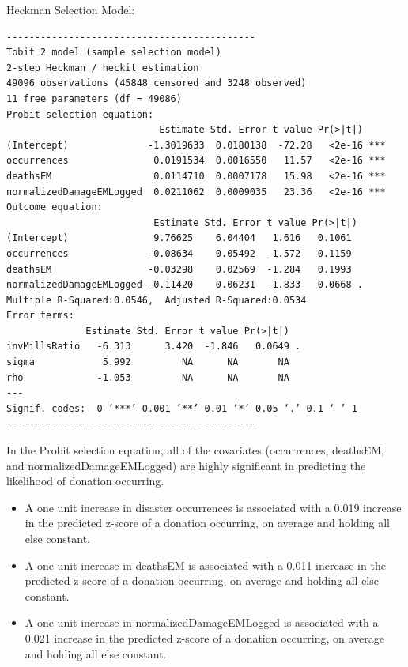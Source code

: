 \documentclass[12pt,letterpaper]{article}
\begin{document}
\noindent Heckman Selection Model:
\begin{verbatim}
--------------------------------------------
Tobit 2 model (sample selection model)
2-step Heckman / heckit estimation
49096 observations (45848 censored and 3248 observed)
11 free parameters (df = 49086)
Probit selection equation:
                           Estimate Std. Error t value Pr(>|t|)    
(Intercept)              -1.3019633  0.0180138  -72.28   <2e-16 ***
occurrences               0.0191534  0.0016550   11.57   <2e-16 ***
deathsEM                  0.0114710  0.0007178   15.98   <2e-16 ***
normalizedDamageEMLogged  0.0211062  0.0009035   23.36   <2e-16 ***
Outcome equation:
                          Estimate Std. Error t value Pr(>|t|)  
(Intercept)               9.76625    6.04404   1.616   0.1061  
occurrences              -0.08634    0.05492  -1.572   0.1159  
deathsEM                 -0.03298    0.02569  -1.284   0.1993  
normalizedDamageEMLogged -0.11420    0.06231  -1.833   0.0668 .
Multiple R-Squared:0.0546,	Adjusted R-Squared:0.0534
Error terms:
              Estimate Std. Error t value Pr(>|t|)  
invMillsRatio   -6.313      3.420  -1.846   0.0649 .
sigma            5.992         NA      NA       NA  
rho             -1.053         NA      NA       NA  
---
Signif. codes:  0 ‘***’ 0.001 ‘**’ 0.01 ‘*’ 0.05 ‘.’ 0.1 ‘ ’ 1
--------------------------------------------
\end{verbatim}

\noindent In the Probit selection equation, all of the covariates (occurrences, deathsEM, and normalizedDamageEMLogged) are highly significant in predicting the likelihood of donation occurring.

\begin{itemize}
\item A one unit increase in disaster occurrences is associated with a 0.019 increase in the predicted z-score of a donation occurring, on average and holding all else constant.

\item A one unit increase in deathsEM is associated with a 0.011 increase in the predicted z-score of a donation occurring, on average and holding all else constant.

\item A one unit increase in normalizedDamageEMLogged is associated with a 0.021 increase in the predicted z-score of a donation occurring, on average and holding all else constant.
\end{itemize}
\end{document}
